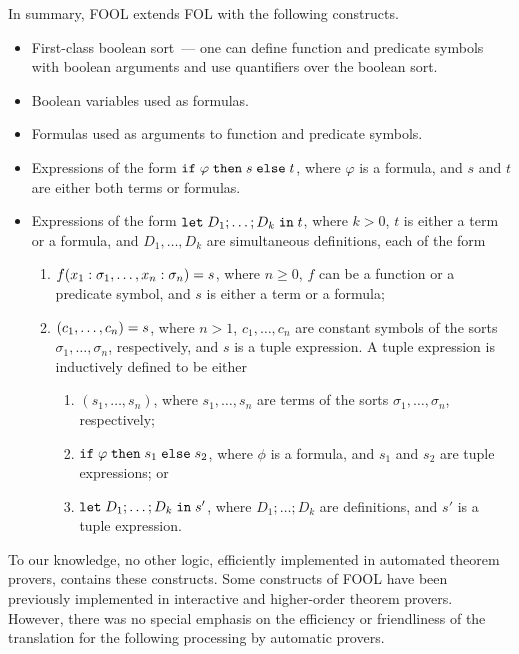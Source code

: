 In summary, FOOL extends FOL with the following constructs. 
\begin{itemize}
  \item First-class boolean sort~--- one can define function and predicate symbols with boolean arguments and use quantifiers over the boolean sort.
  \item Boolean variables used as formulas.
  \item Formulas used as arguments to function and predicate symbols.
  \item Expressions of the form $\mathtt{if}\;{\varphi}\;\allowbreak\mathtt{then}\;{s}\;\allowbreak\mathtt{else}\;{t}$, where $\varphi$ is a formula, and $s$ and $t$ are either both terms or formulas.
  \item Expressions of the form $\mathtt{let}\;{D_1;\ldots;D_k}\;\allowbreak\mathtt{in}\;{t}$, where $k > 0$, $t$ is either a term or a formula, and $D_1,\ldots,D_k$ are simultaneous definitions, each of the form
    \begin{enumerate}
      \item ${f(x_1:\sigma_1,\ldots,x_n:\sigma_n)}={s}$, where $n \geq 0$, $f$ can be a function or a predicate symbol, and $s$ is either a term or a formula;
      \item ${(c_1,\ldots,c_n)}={s}$, where $n > 1$, $c_1,\ldots,c_n$ are constant symbols of the sorts $\sigma_1,\ldots,\sigma_n$, respectively, and $s$ is a tuple expression. A tuple expression is inductively defined to be either
      \begin{enumerate}
        \item $(s_1,\ldots,s_n)$, where $s_1,\ldots,s_n$ are terms of the sorts $\sigma_1,\ldots,\allowbreak\sigma_n$, respectively;
        \item $\mathtt{if}\;{\varphi}\;\allowbreak\mathtt{then}\;{s_1}\;\allowbreak\mathtt{else}\;{s_2}$, where $\phi$ is a formula, and $s_1$ and $s_2$ are tuple expressions; or
        \item $\mathtt{let}\;{D_1;\ldots;D_k}\;\allowbreak\mathtt{in}\;{s'}$, where $D_1;\ldots;D_k$ are definitions, and $s'$ is a tuple expression.
      \end{enumerate}
    \end{enumerate}
\end{itemize}

To our knowledge, no other logic, efficiently implemented in automated theorem provers, contains these constructs. Some constructs of FOOL have been previously implemented in interactive and higher-order theorem provers. However, there was no special emphasis on the efficiency or friendliness of the translation for the following processing by automatic provers.

